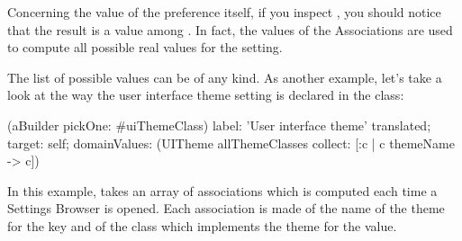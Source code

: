 \documentclass[a4paper,10pt,twoside]{book}
\begin{document}
Concerning the value of the preference itself, if you inspect , you should notice that the result is a value among . In fact, the values of the Associations are used to compute all possible real values for the setting.

The list of possible values can be of any kind. As another example, let's take a look at the way the user interface theme setting is declared in the  class:
\begin{code}{}
(aBuilder pickOne: #uiThemeClass)
	label: 'User interface theme' translated;
	target: self;
	domainValues: (UITheme allThemeClasses collect: [:c | c themeName -> c])
\end{code}
In this example,  takes an array of associations which is computed each time a Settings Browser is opened. Each association is made of the name of the theme for the key and of the class which implements the theme for the value.
\end{document}
